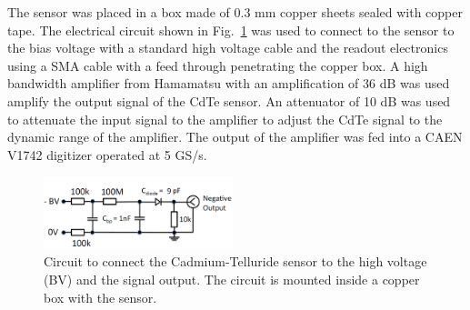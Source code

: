 %
The sensor was placed in a box made of 0.3 mm copper sheets sealed with copper tape. 
The electrical circuit shown in Fig.~\ref{fig:cdtecircuit} was used to connect to the sensor to the bias voltage with a standard high voltage cable and the readout electronics using a SMA cable with a feed through penetrating the copper box.
A high bandwidth amplifier from Hamamatsu with an amplification of 36 dB was used amplify the output signal of the CdTe sensor.
An attenuator of 10 dB was used to attenuate the input signal to the amplifier to adjust the CdTe signal to the dynamic range of the amplifier.
The output of the amplifier was fed into a CAEN V1742 digitizer operated at 5 GS/s.
%
\begin{figure}[htbp] 
\centering
\includegraphics[width=0.49\textwidth]{figures/circuit_CdTe.png} 
\caption{Circuit to connect the Cadmium-Telluride sensor to the high voltage (BV) and the signal output. The circuit is mounted inside a copper box with the sensor.} 
\label{fig:cdtecircuit} 
\end{figure} 
%
